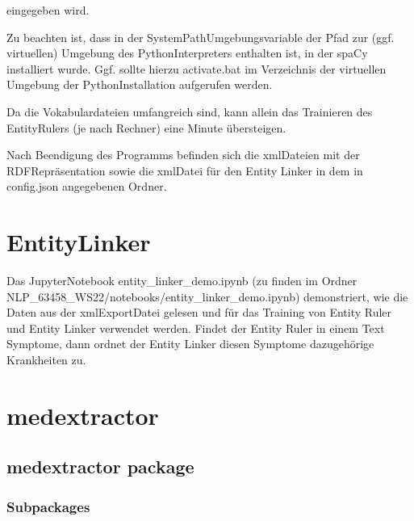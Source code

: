 \documentclass[letterpaper,10pt,english]{sphinxmanual}
\begin{document}
\sphinxAtStartPar
{}

\sphinxAtStartPar
eingegeben wird.

\sphinxAtStartPar
Zu beachten ist, dass in der System\sphinxhyphen{}Path\sphinxhyphen{}Umgebungsvariable der Pfad zur
(ggf. virtuellen) Umgebung des Python\sphinxhyphen{}Interpreters enthalten ist, in der
spaCy installiert wurde. Ggf. sollte hierzu activate.bat im Verzeichnis
der virtuellen Umgebung der Python\sphinxhyphen{}Installation aufgerufen werden.

\sphinxAtStartPar
Da die Vokabulardateien umfangreich sind, kann allein das Trainieren des
Entity\sphinxhyphen{}Rulers (je nach Rechner) eine Minute übersteigen.

\sphinxAtStartPar
Nach Beendigung des Programms befinden sich die xml\sphinxhyphen{}Dateien mit der
RDF\sphinxhyphen{}Repräsentation sowie die xml\sphinxhyphen{}Datei für den Entity Linker in dem in
config.json angegebenen Ordner.


\chapter{Entity\sphinxhyphen{}Linker}
\label{\detokenize{readme:entity-linker}}
\sphinxAtStartPar
Das Jupyter\sphinxhyphen{}Notebook entity\_linker\_demo.ipynb (zu finden im Ordner
NLP\_63458\_WS22/notebooks/entity\_linker\_demo.ipynb) demonstriert, wie die
Daten aus der xml\sphinxhyphen{}Export\sphinxhyphen{}Datei gelesen und für das Training von Entity
Ruler und Entity Linker verwendet werden. Findet der Entity Ruler in
einem Text Symptome, dann ordnet der Entity Linker diesen Symptome
dazugehörige Krankheiten zu.

\sphinxstepscope


\chapter{medextractor}
\label{\detokenize{modules:medextractor}}\label{\detokenize{modules::doc}}
\sphinxstepscope


\section{medextractor package}
\label{\detokenize{medextractor:medextractor-package}}\label{\detokenize{medextractor::doc}}

\subsection{Subpackages}
\label{\detokenize{medextractor:subpackages}}
\sphinxstepscope
\end{document}
